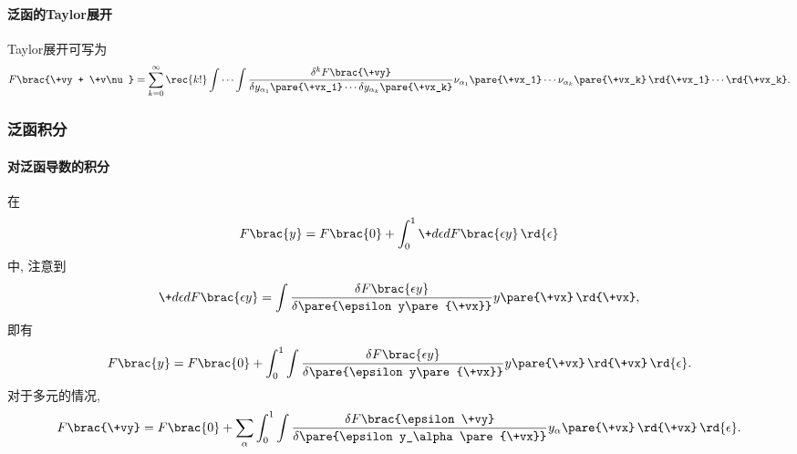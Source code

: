 \documentclass[hidelinks]{ctexart}
\begin{document}

\paragraph{泛函的Taylor展开} %
\label{par:泛函的taylor展开}

Taylor展开可写为
\[ F\brac{\+vy + \+v\nu} = \sum_{k=0}^\infty \rec{k!} \int \cdots \int \frac{\delta^k F\brac{\+vy}}{\delta y_{\alpha_1}\pare{\+vx_1} \cdots \delta y_{\alpha_k}\pare{\+vx_k}}\nu_{\alpha_1}\pare{\+vx_1}\cdots \nu_{\alpha_k}\pare{\+vx_k}\,\rd{\+vx_1}\cdots \rd{\+vx_k}. \]



\subsubsection{泛函积分} %
\label{ssub:泛函积分}

\paragraph{对泛函导数的积分} %
\label{par:对泛函导数的积分}

在
\[ F\brac{y} = F\brac{0} + \int_0^1 \+d\epsilon d{F\brac{\epsilon y}}\,\rd{\epsilon} \]
中, 注意到
\[ \+d\epsilon d{F\brac{\epsilon y}} = \int \frac{\delta F\brac{\epsilon y}}{\delta\pare{\epsilon y\pare{\+vx}}} y\pare{\+vx}\,\rd{\+vx}, \]
即有
\[ F\brac{y} = F\brac{0} + \int_0^1 \int \frac{\delta F\brac{\epsilon y}}{\delta\pare{\epsilon y\pare{\+vx}}} y\pare{\+vx}\,\rd{\+vx}\,\rd{\epsilon}. \]
对于多元的情况,
\[ F\brac{\+vy} = F\brac{0} + \sum_\alpha \int_0^1 \int \frac{\delta F\brac{\epsilon \+vy}}{\delta\pare{\epsilon y_\alpha\pare{\+vx}}} y_\alpha\pare{\+vx}\,\rd{\+vx}\,\rd{\epsilon}. \]




\end{document}
